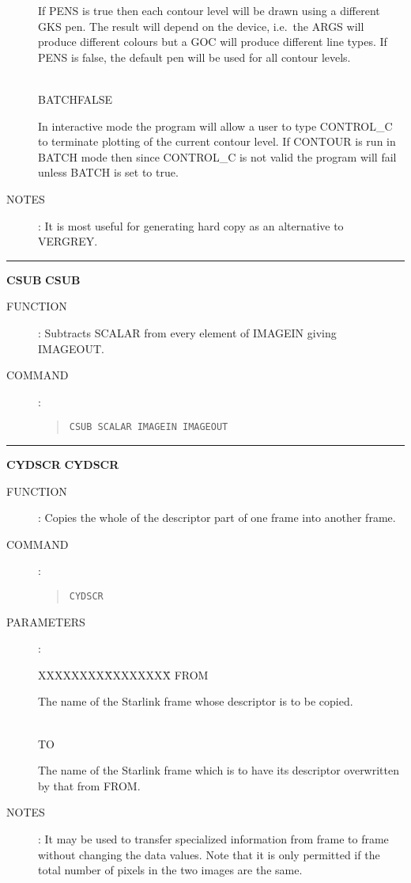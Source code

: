 \begin{description}
\begin{tabbing}
\begin{minipage}[t]{100mm}
If PENS is true then each contour level will be drawn using a different GKS pen.
The result will depend on the device, i.e.\ the ARGS will produce different
colours but a GOC will produce different line types.
If PENS is false, the default pen will be used for all contour levels.
\end{minipage}\\
BATCH\>FALSE\>\begin{minipage}[t]{100mm}
In interactive mode the program will allow a user to type CONTROL\_C to
terminate plotting of the current contour level.
If CONTOUR is run in BATCH mode then since CONTROL\_C is not valid the program
will fail unless BATCH is set to true.
\end{minipage}
\end{tabbing}
\item [NOTES]:
It is most useful for generating hard copy as an alternative to VERGREY.
\end{description}

\goodbreak
\rule{\textwidth}{0.3mm}
{\Large {\bf CSUB} \hfill {\bf CSUB}}
\begin{description}
\item [FUNCTION]:
Subtracts SCALAR from every element of IMAGEIN giving IMAGEOUT.
\item [COMMAND]:
\begin{quote}
{\tt CSUB  SCALAR  IMAGEIN  IMAGEOUT}
\end{quote}
\end{description}

\goodbreak
\rule{\textwidth}{0.3mm}
{\Large {\bf CYDSCR} \hfill {\bf CYDSCR}}
\begin{description}
\item [FUNCTION]:
Copies the whole of the descriptor part of one frame into another frame.
\item [COMMAND]:
\begin{quote}
{\tt CYDSCR}
\end{quote}
\item [PARAMETERS] :
\begin{tabbing}
XXXXXXXX\=XXXXXXXX\=\kill
FROM\>\>\begin{minipage}[t]{100mm}
The name of the Starlink frame whose descriptor is to be copied.
\end{minipage}\\
TO\>\>\begin{minipage}[t]{100mm}
The name of the Starlink frame which is to have its descriptor overwritten by
that from FROM.
\end{minipage}
\end{tabbing}
\item [NOTES]:
It may be used to transfer specialized information from frame to frame without
changing the data values.
Note that it is only permitted if the total number of pixels in the two images
are the same.
\end{description}

